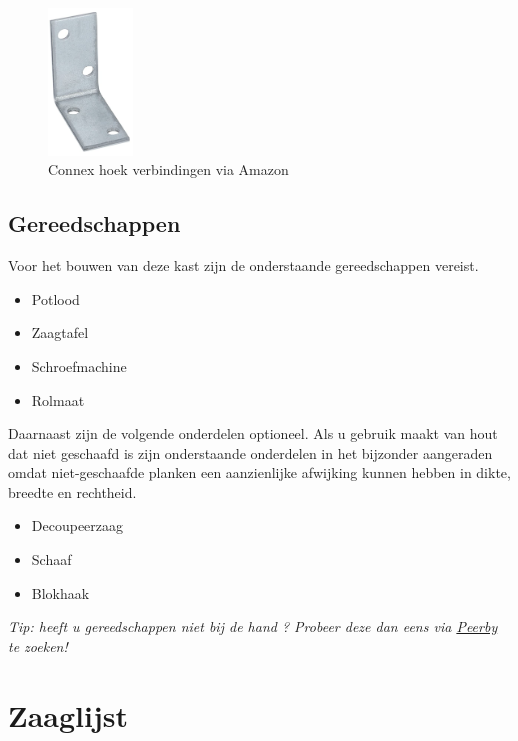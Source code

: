 \documentclass{article}
\begin{document}


\begin{figure}[h!]
    \centering
    \includegraphics[width=0.2\textwidth]{hoeken.png}
    \caption{Connex hoek verbindingen via Amazon}
    \label{fig:hoeken}
\end{figure}

\subsection{Gereedschappen}

Voor het bouwen van deze kast zijn de onderstaande gereedschappen vereist.

\begin{itemize}
    \item Potlood 
    \item Zaagtafel
    \item Schroefmachine
    \item Rolmaat
\end{itemize}

Daarnaast zijn de volgende onderdelen optioneel. Als u gebruik maakt van hout dat niet geschaafd is zijn onderstaande onderdelen in het bijzonder aangeraden omdat niet-geschaafde planken een aanzienlijke afwijking kunnen hebben in dikte, breedte en rechtheid.

\begin{itemize}
    \item Decoupeerzaag
    \item Schaaf
    \item Blokhaak
\end{itemize}

\begin{center}
    \textit{Tip: heeft u gereedschappen niet bij de hand ? Probeer deze dan eens via \href{https://www.peerby.com/en-nl}{Peerby} te zoeken!}
\end{center}

\clearpage
\newpage

\section{Zaaglijst}
\end{document}
